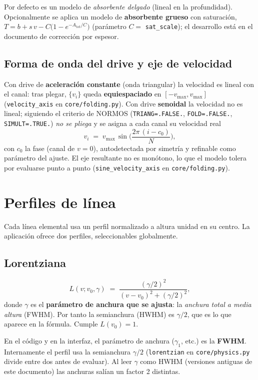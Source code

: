 \documentclass[11pt,a4paper]{article}
\newcommand{\code}[1]{\texttt{\small #1}}
\begin{document}
Por defecto es un modelo de \emph{absorbente delgado} (lineal en la profundidad).
Opcionalmente se aplica un modelo de \textbf{absorbente grueso} con saturación,
$T = b + s\,v - C\bigl(1-e^{-A_{\text{tot}}/C}\bigr)$ (parámetro $C=$
\code{sat\_scale}); el desarrollo está en el documento de corrección por espesor.

\subsection{Forma de onda del drive y eje de velocidad}\label{sec:drive}
Con drive de \textbf{aceleración constante} (onda triangular) la velocidad es
lineal con el canal: tras plegar, $\{v_i\}$ queda \textbf{equiespaciado} en
$[-v_{\max},v_{\max}]$ (\code{velocity\_axis} en \code{core/folding.py}). Con drive
\textbf{senoidal} la velocidad no es lineal; siguiendo el criterio de NORMOS
(\code{TRIANG=.FALSE.}, \code{FOLD=.FALSE.}, \code{SIMULT=.TRUE.}) \emph{no se
pliega} y se asigna a cada canal su velocidad real
\begin{equation}
  v_i \;=\; v_{\max}\,\sin\!\Big(\frac{2\pi\,(i-c_0)}{N}\Big),
\end{equation}
con $c_0$ la fase (canal de $v=0$), autodetectada por simetría y refinable como
parámetro del ajuste. El eje resultante no es monótono, lo que el modelo tolera
por evaluarse punto a punto (\code{sine\_velocity\_axis} en \code{core/folding.py}).

\section{Perfiles de línea}\label{sec:lineshape}

Cada línea elemental usa un perfil normalizado a altura unidad en su centro. La
aplicación ofrece dos perfiles, seleccionables globalmente.

\subsection{Lorentziana}
\begin{equation}
  L(v;v_0,\gamma) \;=\; \frac{(\gamma/2)^{2}}{(v-v_0)^{2}+(\gamma/2)^{2}},
  \label{eq:lorentz}
\end{equation}
donde $\gamma$ es el \textbf{parámetro de anchura que se ajusta}: la
\emph{anchura total a media altura} (FWHM). Por tanto la semianchura (HWHM) es
$\gamma/2$, que es lo que aparece en la fórmula. Cumple $L(v_0)=1$.

\begin{nota}
En el código y en la interfaz, el parámetro de anchura ($\gamma_1$, etc.) es la
\textbf{FWHM}. Internamente el perfil usa la semianchura $\gamma/2$
(\code{lorentzian} en \code{core/physics.py} divide entre dos antes de evaluar).
Al leer $\gamma$ como HWHM (versiones antiguas de este documento) las anchuras
salían un factor 2 distintas.
\end{nota}
\end{document}
